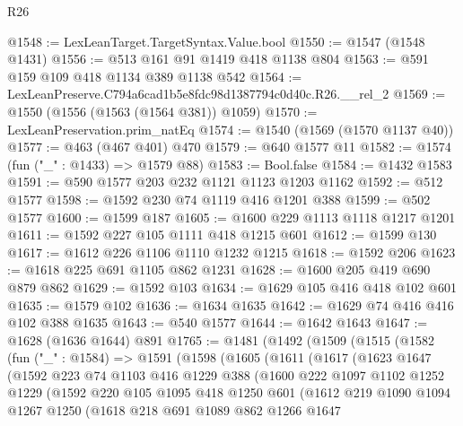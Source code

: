 \begin{lexlean}{R26}
\begin{coremodule}
@1548 := LexLeanTarget.TargetSyntax.Value.bool
@1550 := @1547 (@1548 @1431)
@1556 := @513 @161 @91 @1419 @418 @1138 @804
@1563 := @591 @159 @109 @418 @1134 @389 @1138 @542
@1564 := LexLeanPreserve.C794a6cad1b5e8fdc98d1387794c0d40c.R26.__rel_2
@1569 := @1550 (@1556 (@1563 (@1564 @381)) @1059)
@1570 := LexLeanPreservation.prim_natEq
@1574 := @1540 (@1569 (@1570 @1137 @40))
@1577 := @463 (@467 @401) @470
@1579 := @640 @1577 @11
@1582 := @1574 (fun ("_" : @1433) => @1579 @88)
@1583 := Bool.false
@1584 := @1432 @1583
@1591 := @590 @1577 @203 @232 @1121 @1123 @1203 @1162
@1592 := @512 @1577
@1598 := @1592 @230 @74 @1119 @416 @1201 @388
@1599 := @502 @1577
@1600 := @1599 @187
@1605 := @1600 @229 @1113 @1118 @1217 @1201
@1611 := @1592 @227 @105 @1111 @418 @1215 @601
@1612 := @1599 @130
@1617 := @1612 @226 @1106 @1110 @1232 @1215
@1618 := @1592 @206
@1623 := @1618 @225 @691 @1105 @862 @1231
@1628 := @1600 @205 @419 @690 @879 @862
@1629 := @1592 @103
@1634 := @1629 @105 @416 @418 @102 @601
@1635 := @1579 @102
@1636 := @1634 @1635
@1642 := @1629 @74 @416 @416 @102 @388 @1635
@1643 := @540 @1577
@1644 := @1642 @1643
@1647 := @1628 (@1636 @1644) @891
@1765 := @1481
    (@1492
      (@1509
        (@1515
          (@1582
            (fun ("_" : @1584) =>
            @1591
              (@1598
                (@1605
                  (@1611
                    (@1617
                      (@1623
                        @1647
                        (@1592
                          @223
                          @74
                          @1103
                          @416
                          @1229
                          @388
                          (@1600
                            @222
                            @1097
                            @1102
                            @1252
                            @1229
                            (@1592
                              @220
                              @105
                              @1095
                              @418
                              @1250
                              @601
                              (@1612
                                @219
                                @1090
                                @1094
                                @1267
                                @1250
                                (@1618
                                  @218
                                  @691
                                  @1089
                                  @862
                                  @1266
                                  @1647

\end{coremodule}
\end{lexlean}
